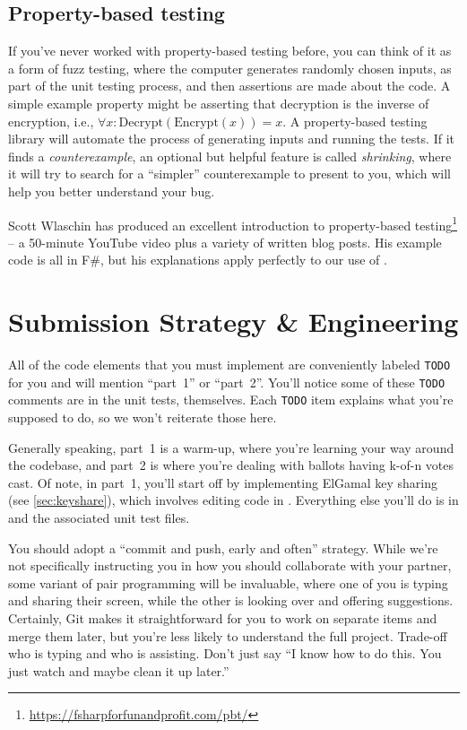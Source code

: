 \subsection{Property-based testing}
\label{sec:properties}
If you've never worked with property-based testing before, you can
think of it as a form of fuzz testing, where the computer generates
randomly chosen inputs, as part of the unit testing process, and then
assertions are made about the code. A simple example property might be
asserting that decryption is the inverse of encryption, i.e.,
$\forall x: \mathrm{Decrypt}(\mathrm{Encrypt}(x)) = x$. A
property-based testing library will automate the process of generating
inputs and running the tests. If it finds a {\em counterexample}, an
optional but helpful feature is called {\em shrinking}, where it will
try to search for a ``simpler'' counterexample to present to you,
which will help you better understand your bug. 

Scott Wlaschin has produced an excellent introduction to property-based
testing\footnote{\url{https://fsharpforfunandprofit.com/pbt/}} -- a
50-minute YouTube video plus a variety of written blog posts. His
example code is all in F\#, but his explanations apply
perfectly to our use of .

\section{Submission Strategy \& Engineering}

All of the code elements that you must implement are conveniently
labeled {\tt TODO} for you and will mention ``part~1'' or ``part~2''.
You'll notice some of these {\tt TODO} comments are in the unit tests,
themselves. Each {\tt TODO} item explains what you're supposed to do,
so we won't reiterate those here.

Generally speaking, part~1 is a warm-up, where you're learning your
way around the codebase, and part~2 is where you're dealing with
ballots having k-of-n votes cast. Of note, in part~1, you'll start
off by implementing ElGamal key sharing (see \ref{sec:keyshare}),
which involves editing code in .
Everything else you'll do is in 
and the associated unit test files.

You should adopt a ``commit and push, early and often'' strategy.
While we're not specifically instructing you in how you should
collaborate with your partner, some variant of pair programming will
be invaluable, where one of you is typing and sharing their screen,
while the other is looking over and offering suggestions. Certainly,
Git makes it straightforward for you to work on separate items and
merge them later, but you're less likely to understand the full
project. Trade-off who is typing and who is assisting. Don't just say
``I know how to do this. You just watch and maybe clean it up later.''

